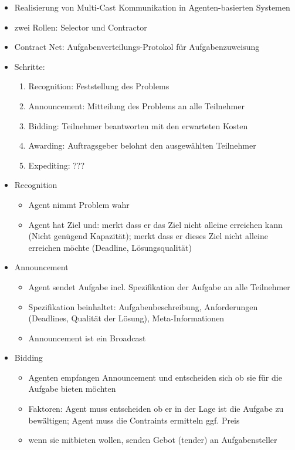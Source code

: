 \documentclass{article} %
\begin{document}
	\begin{itemize}
		\item Realisierung von Multi-Cast Kommunikation in Agenten-basierten Systemen
		\item zwei Rollen: Selector und Contractor
		\item Contract Net: Aufgabenverteilungs-Protokol für Aufgabenzuweisung
		\item Schritte:
		\begin{enumerate}
			\item Recognition: Feststellung des Problems
			\item Announcement: Mitteilung des Problems an alle Teilnehmer
			\item Bidding: Teilnehmer beantworten mit den erwarteten Kosten
			\item Awarding: Auftragsgeber belohnt den ausgewählten Teilnehmer
			\item Expediting: ???
		\end{enumerate}
		\item Recognition
		\begin{itemize}
			\item Agent nimmt Problem wahr
			\item Agent hat Ziel und: merkt dass er das Ziel nicht alleine erreichen kann (Nicht genügend Kapazität); merkt dass er dieses Ziel nicht alleine erreichen möchte (Deadline, Lösungsqualität)
		\end{itemize}
		\item Announcement
		\begin{itemize}
			\item Agent sendet Aufgabe incl. Spezifikation der Aufgabe an alle Teilnehmer
			\item Spezifikation beinhaltet: Aufgabenbeschreibung, Anforderungen (Deadlines, Qualität der Lösung), Meta-Informationen
			\item Announcement ist ein Broadcast
		\end{itemize}
		\item Bidding
		\begin{itemize}
			\item Agenten empfangen Announcement und entscheiden sich ob sie für die Aufgabe bieten möchten
			\item Faktoren: Agent muss entscheiden ob er in der Lage ist die Aufgabe zu bewältigen; Agent muss die Contraints ermitteln ggf. Preis
			\item wenn sie mitbieten wollen, senden Gebot (tender) an Aufgabensteller
		\end{itemize}

\end{itemize}
\end{document}
